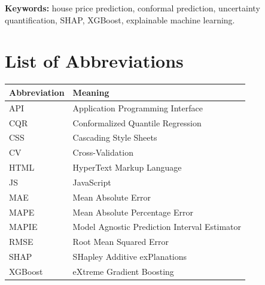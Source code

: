 \documentclass[12pt]{report}
\begin{document}
\textbf{Keywords:} house price prediction, conformal prediction, uncertainty
quantification, SHAP, XGBoost, explainable machine learning.

\newpage
\tableofcontents

\newpage
\listoffigures

\newpage
\listoftables

\newpage
\chapter*{List of Abbreviations}
\begin{table}[h]
\centering
\begin{tabular}{ll}
\toprule
Abbreviation & Meaning \\
\midrule
API & Application Programming Interface \\
CQR & Conformalized Quantile Regression \\
CSS & Cascading Style Sheets \\
CV & Cross-Validation \\
HTML & HyperText Markup Language \\
JS & JavaScript \\
MAE & Mean Absolute Error \\
MAPE & Mean Absolute Percentage Error \\
MAPIE & Model Agnostic Prediction Interval Estimator \\
RMSE & Root Mean Squared Error \\
SHAP & SHapley Additive exPlanations \\
XGBoost & eXtreme Gradient Boosting \\
\bottomrule
\end{tabular}
\end{table}

\newpage
{}

\end{document}
